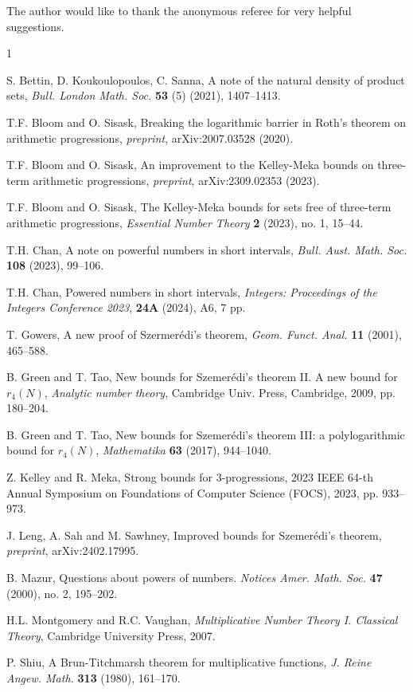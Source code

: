\documentclass[12pt]{article}
\begin{document}
 The author would like to thank the anonymous referee for very helpful suggestions.


\begin{thebibliography}{1}

 S. Bettin, D. Koukoulopoulos, C. Sanna, A note of the natural density of product sets, {\it Bull. London Math. Soc.} {\bf 53} (5) (2021), 1407--1413.

 T.F. Bloom and O. Sisask, Breaking the logarithmic barrier in Roth's theorem on arithmetic progressions, {\it preprint}, arXiv:2007.03528 (2020).

 T.F. Bloom and O. Sisask,  An improvement to the Kelley-Meka bounds on three-term arithmetic progressions, {\it preprint}, arXiv:2309.02353 (2023).

 T.F. Bloom and O. Sisask,  The Kelley-Meka bounds for sets free of three-term arithmetic progressions, {\it Essential Number Theory} {\bf 2} (2023), no. 1, 15--44.

 T.H. Chan, A note on powerful numbers in short intervals, {\it Bull. Aust. Math. Soc.} {\bf 108} (2023), 99--106.

 T.H. Chan, Powered numbers in short intervals, {\it Integers: Proceedings of the Integers Conference 2023}, {\bf 24A} (2024), A6, 7 pp.

 T. Gowers, A new proof of Szermer\'{e}di's theorem, {\it Geom. Funct. Anal.} {\bf 11} (2001), 465--588.

 B. Green and T. Tao, New bounds for Szemer\'{e}di's theorem II. A new bound for $r_4(N)$, {\it Analytic number theory}, Cambridge Univ. Press, Cambridge, 2009, pp. 180--204.

 B. Green and T. Tao, New bounds for Szemer\'{e}di's theorem III: a polylogarithmic bound for $r_4(N)$, {\it Mathematika} {\bf 63} (2017), 944--1040.

 Z. Kelley and R. Meka, Strong bounds for $3$-progressions, 2023 IEEE 64-th Annual Symposium on Foundations of Computer Science (FOCS), 2023, pp. 933--973.

 J. Leng, A. Sah and M. Sawhney, Improved bounds for Szemer\'{e}di's theorem, {\it preprint}, arXiv:2402.17995.

 B. Mazur, Questions about powers of numbers. {\it Notices Amer. Math. Soc.} {\bf 47} (2000), no. 2, 195--202.

 H.L. Montgomery and R.C. Vaughan, {\it Multiplicative Number Theory I. Classical Theory}, Cambridge University Press, 2007.

 P. Shiu, A Brun-Titchmarsh theorem for multiplicative functions, {\it J. Reine Angew. Math.} {\bf 313} (1980), 161--170.

\end{thebibliography} 
\end{document}
